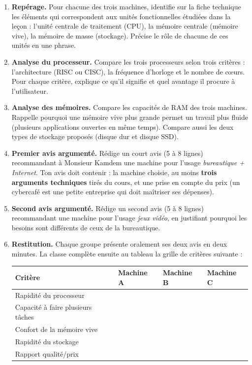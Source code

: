 \documentclass[11pt]{article}
\begin{document}
\begin{enumerate}
\item \textbf{Repérage.} Pour chacune des trois machines, identifie sur la fiche technique les éléments qui correspondent aux unités fonctionnelles étudiées dans la leçon : l'unité centrale de traitement (CPU), la mémoire centrale (mémoire vive), la mémoire de masse (stockage). Précise le rôle de chacune de ces unités en une phrase.
\item \textbf{Analyse du processeur.} Compare les trois processeurs selon trois critères : l'architecture (RISC ou CISC), la fréquence d'horloge et le nombre de cœurs. Pour chaque critère, explique ce qu'il signifie et quel avantage il procure à l'utilisateur.
\item \textbf{Analyse des mémoires.} Compare les capacités de RAM des trois machines. Rappelle pourquoi une mémoire vive plus grande permet un travail plus fluide (plusieurs applications ouvertes en même temps). Compare aussi les deux types de stockage proposés (disque dur et disque SSD).
\item \textbf{Premier avis argumenté.} Rédige un court avis (5 à 8 lignes) recommandant à Monsieur Kamdem une machine pour l'usage \emph{bureautique + Internet}. Ton avis doit contenir : la machine choisie, au moins \textbf{trois arguments techniques} tirés du cours, et une prise en compte du prix (un cybercafé est une petite entreprise qui doit maîtriser ses dépenses).
\item \textbf{Second avis argumenté.} Rédige un second avis (5 à 8 lignes) recommandant une machine pour l'usage \emph{jeux vidéo}, en justifiant pourquoi les besoins sont différents de ceux de la bureautique.
\item \textbf{Restitution.} Chaque groupe présente oralement ses deux avis en deux minutes. La classe complète ensuite au tableau la grille de critères suivante :

\begin{center}
\begin{tabularx}{\linewidth}{|l|X|X|X|}
\hline
\rowcolor{popblueL} \textbf{Critère} & \textbf{Machine A} & \textbf{Machine B} & \textbf{Machine C} \\
\hline
Rapidité du processeur & & & \\
\hline
Capacité à faire plusieurs tâches & & & \\
\hline
Confort de la mémoire vive & & & \\
\hline
Rapidité du stockage & & & \\
\hline
Rapport qualité/prix & & & \\
\hline
\end{tabularx}
\end{center}

\end{enumerate}
\end{document}
